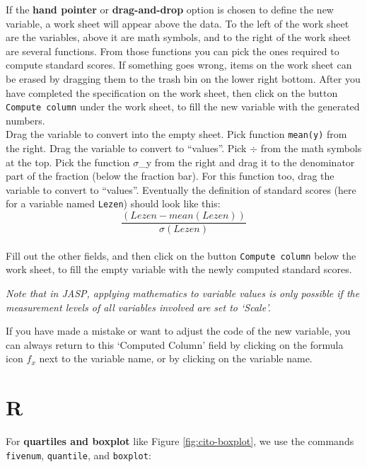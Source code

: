 \documentclass[
]{book}
\newenvironment{Shaded}{\begin{snugshade}}{\end{snugshade}}
\newcommand{\CommentTok}[1]{\textcolor[rgb]{0.56,0.35,0.01}{\textit{#1}}}
\newcommand{\FunctionTok}[1]{\textcolor[rgb]{0.13,0.29,0.53}{\textbf{#1}}}
\newcommand{\NormalTok}[1]{#1}
\newcommand{\OtherTok}[1]{\textcolor[rgb]{0.56,0.35,0.01}{#1}}
\newcommand{\SpecialCharTok}[1]{\textcolor[rgb]{0.81,0.36,0.00}{\textbf{#1}}}
\newcommand{\StringTok}[1]{\textcolor[rgb]{0.31,0.60,0.02}{#1}}
\begin{document}
If the \textbf{hand pointer} or \textbf{drag-and-drop} option is chosen to define the new variable, a work sheet will appear above the data. To the left of the work sheet are the variables, above it are math symbols, and to the right of the work sheet are several functions. From those functions you can pick the ones required to compute standard scores. If something goes wrong, items on the work sheet can be erased by dragging them to the trash bin on the lower right bottom. After you have completed the specification on the work sheet, then click on the button \texttt{Compute\ column} under the work sheet, to fill the new variable with the generated numbers.\\
Drag the variable to convert into the empty sheet. Pick function \texttt{mean(y)} from the right.
Drag the variable to convert to ``values''. Pick \(\div\) from the math symbols at the top.
Pick the function \(\sigma\)\_y from the right and drag it to the denominator part of the fraction (below the fraction bar). For this function too, drag the variable to convert to ``values''.
Eventually the definition of standard scores (here for a variable named \texttt{Lezen}) should look like this: \[\frac{(Lezen-mean(Lezen))}{\sigma (Lezen)}\]\\
Fill out the other fields, and then click on the button \texttt{Compute\ column} below the work sheet, to fill the empty variable with the newly computed standard scores.

\emph{Note that in JASP, applying mathematics to variable values is only possible if the measurement levels of all variables involved are set to `Scale'.}

If you have made a mistake or want to adjust the code of the new variable, you can always return to this `Computed Column' field by clicking on the formula icon \(f_x\) next to the variable name, or by clicking on the variable name.

\section{R}\label{r-3}

For \textbf{quartiles and boxplot} like Figure \ref{fig:cito-boxplot}, we use the commands \texttt{fivenum}, \texttt{quantile}, and \texttt{boxplot}:

\begin{Shaded}
\end{Shaded}
\end{document}
